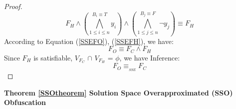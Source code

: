 \documentclass[conference]{IEEEtran}
\begin{document}
\begin{proof}
\begin{equation}
F_H \wedge (\bigwedge_{1\leqslant i\leqslant n}^{B_i \equiv T}y_i)\wedge
(\bigwedge_{1\leqslant j\leqslant n}^{B_j\equiv F}\neg y_j)\equiv F_H 
\end{equation}
According to Equation (\ref{SSEFO}), (\ref{SSEFH}), we have:
\begin{equation}\label{SSEEND}
F_O\equiv F_C \wedge F_H 
\end{equation}
Since $F_H$ is satisfiable, $V_{F_C}$ $\cap$ $V_{F_H}$ = $\phi$, we have Inference:
\begin{equation}
F_O\equiv_{_{SSE}}  F_C  
\end{equation}
\end{proof}

\textbf{Theorem \ref{SSOtheorem} Solution Space Overapproximated (SSO) Obfuscation}
\end{document}
